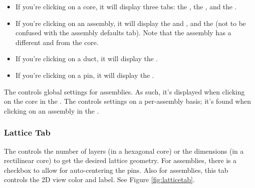 \begin{itemize}
	\item{If you're clicking on a core, it will display three tabs: the , the , and the .}
	\item{If you're clicking on an assembly, it will display the  and , and the  (not to be confused with the assembly defaults tab).  Note that the assembly has a different  and  from the core.}
	\item{If you're clicking on a duct, it will display the .}
	\item{If you're clicking on a pin, it will display the .}
\end{itemize}

\begin{commonerrors}
	The  controls global settings for assemblies.  As such, it's displayed when clicking on the core in the .  The  controls settings on a per-assembly basis; it's found when clicking on an assembly in the .
\end{commonerrors}

\subsubsection{Lattice Tab}
The  controls the number of layers (in a hexagonal core) or the dimensions (in a rectilinear core) to get the desired lattice geometry.  For assemblies, there is a checkbox to allow for auto-centering the pins.  Also for assemblies, this tab controls the 2D view color and label.  See Figure \ref{fig:latticetab}.

